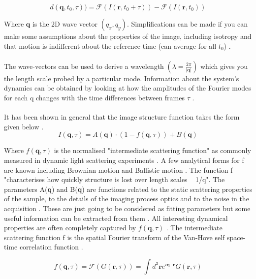 \documentclass[11pt]{article}
\begin{document}
\begin{equation}
    d(\textbf{q}, t_0, \tau) ) = \mathscr{F}(I(\mathbf{r}, t_0 + \tau)) - \mathscr{F}(I(\mathbf{r}, t_0))
\end{equation}

Where $\textbf{q}$ is the 2D wave vector $(q_x, q_y)$.
Simplifications can be made if you can make some assumptions about the properties of the image, including isotropy and that motion is indifferent about the reference time (can average for all $t_0$) \cite{ddm1}.
\\\\
The wave-vectors can be used to derive a wavelength $(\lambda = \frac{2\pi}{|\textbf{q}|})$ which gives you the length scale probed by a particular mode.
Information about the system's dynamics can be obtained by looking at how the amplitudes of the Fourier modes for each q changes with the time differences between frames $\tau$ \cite{ddm2}.
\\\\

It has been shown in general that the image structure function takes the form given below \cite{ddm1}.
\begin{equation}
	I(\textbf{q}, \tau) = A(\textbf{q}) \cdot (1 - f(\textbf{q}, \tau)) + B(\textbf{q})
\end{equation}

Where $f(\textbf{q}, \tau)$ is the normalised "intermediate scattering function" as commonly measured in dynamic light scattering experiments \cite{DLSPecora}. A few analytical forms for f are known including Brownian motion and Ballistic motion \cite{DLSPecora}. The function f "characterises how quickly structure is lost over length scales ~ 1/q"\cite{ddm1}. The parameters A(\textbf{q}) and B(\textbf{q}) are functions related to the static scattering properties of the sample, to the details of the imaging process optics and to the noise in the acquisition \cite{ddm1}. These are just going to be considered as fitting parameters but some useful information can be extracted from them \cite{ddm1}. All interesting dynamical properties are often completely captured by $f(\textbf{q}, \tau)$ \cite{ddm1}. The intermediate scattering function f is the spatial Fourier transform of the Van-Hove self space-time correlation function \cite{DLSPecora}.

\begin{equation}
	f(\textbf{q}, \tau) = \mathscr{F} (G(\textbf{r}, \tau)) = \int d^3 \textbf{r} e^{i \textbf{q} \cdot \textbf{r}} G(\textbf{r}, \tau)
\end{equation}
\end{document}
